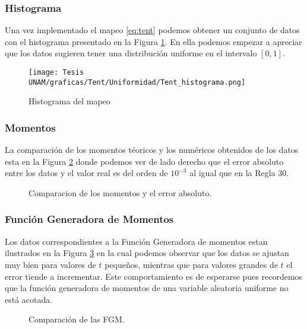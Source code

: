 \documentclass[../Main.tex]{subfiles}
\begin{document}
\subsubsection{Histograma}
Una vez implementado el mapeo \ref{eq:tent} podemos obtener un conjunto de datos con el histograma presentado en la Figura \ref{fig:hist_tent}. En ella podemos empezar a apreciar que los datos sugieren tener una distribución uniforme en el intervalo $[0,1]$.

\begin{figure}[h]
    \centering
    \texttt{[image: Tesis UNAM/graficas/Tent/Uniformidad/Tent\_histograma.png]}
    \caption{Histograma del mapeo}
    \label{fig:hist_tent}
\end{figure} 

\subsubsection{Momentos}
La comparación de los momentos téoricos y los numéricos obtenidos de los datos esta en la Figura \ref{fig:momentos_tent} donde podemos ver de lado derecho que el error absoluto entre los datos y el valor real es del orden de $10^{-3}$ al igual que en la Regla 30.
\begin{figure}[h!]
\hfill
{}
\hfill
{}
\hfill
\caption{Comparacion de los momentos y el error absoluto.}
\label{fig:momentos_tent}
\end{figure}

\subsubsection{Función Generadora de Momentos}
Los datos correspondientes a la Función Generadora de momentos estan ilustrados en la Figura \ref{fig:FGM_tent} en la cual podemos observar que los datos se ajustan muy bien para valores de $t$ pequeños, mientras que para valores grandes de $t$ el error tiende a incrementar. Este comportamiento es de esperarse pues recordemos que la función generadora de momentos de una variable aleatoria uniforme no está acotada. 

\begin{figure}[h!]
\hfill
{}
\hfill
{}
\hfill
\caption{Comparación de las FGM.}
\label{fig:FGM_tent}
\end{figure}
\end{document}
